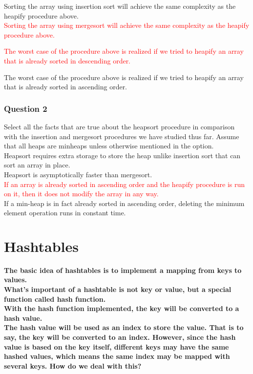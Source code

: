 \documentclass{article}
\begin{document}
Sorting the array using insertion sort will achieve the same complexity as the heapify procedure above. \\

\textcolor{red}{Sorting the array using mergesort will achieve the same complexity as the heapify procedure above.\\}

\textcolor{red}{The worst case of the procedure above is realized if we tried to heapify an array that is already sorted in descending order.\\}

The  worst case of the procedure above is realized if we tried to heapify an array that is already sorted in ascending order.\\

\subsubsection{Question 2}

Select all the facts that are true about the heapsort procedure in comparison with the insertion and mergesort procedures we have studied thus far. 
Assume that all heaps are minheaps unless otherwise mentioned in the option.\\

Heapsort requires extra storage to store the heap unlike insertion sort that can sort an array in place.\\

Heapsort is asymptotically faster than mergesort.\\

\textcolor{red}{If an array is already sorted in ascending order and the heapify procedure is run on it, then it does not modify the array in any way.} \\

If a min-heap is in fact already sorted in ascending order, deleting the minimum element operation runs in constant time.\\



\section{Hashtables}

\paragraph{The basic idea of hashtables is to implement a mapping from keys to values.\\
What's important of a hashtable is not key or value, but a special function called hash function.\\
With the hash function implemented, the key will be converted to a hash value.\\
The hash value will be used as an index to store the value. That is to say, the key will be converted to an index. However, since the hash value is based on the key itself,
different keys may have the same hashed values, which means the same index may be mapped with several keys. How do we deal with this?\\}
\end{document}
